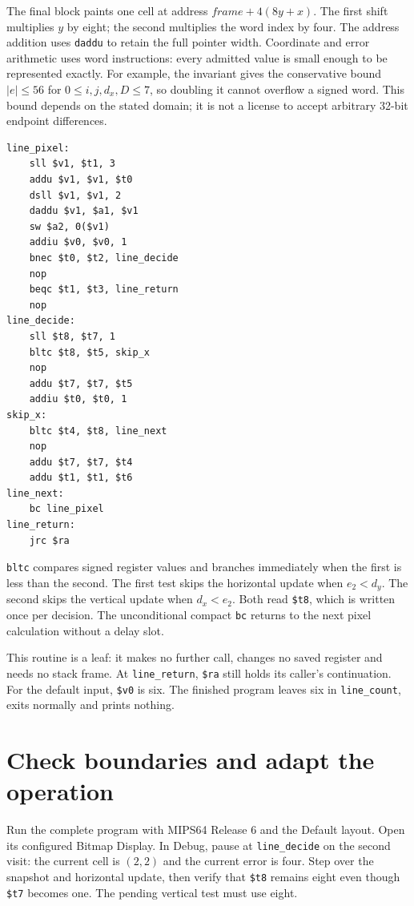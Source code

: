 The final block paints one cell at address $frame+4(8y+x)$. The first shift
multiplies $y$ by eight; the second multiplies the word index by four. The address
addition uses \texttt{daddu} to retain the full pointer width. Coordinate and error
arithmetic uses word instructions: every admitted value is small enough to be
represented exactly. For example, the invariant gives the conservative bound
$|e|\leq56$ for $0\leq i,j,d_x,D\leq7$, so doubling it cannot overflow a signed word.
This bound depends on the stated domain; it is not a license to accept arbitrary
32-bit endpoint differences.

\noindent\begin{minipage}{\linewidth}
  \begin{verbatim}
line_pixel:
    sll $v1, $t1, 3
    addu $v1, $v1, $t0
    dsll $v1, $v1, 2
    daddu $v1, $a1, $v1
    sw $a2, 0($v1)
    addiu $v0, $v0, 1
    bnec $t0, $t2, line_decide
    nop
    beqc $t1, $t3, line_return
    nop
line_decide:
    sll $t8, $t7, 1
    bltc $t8, $t5, skip_x
    nop
    addu $t7, $t7, $t5
    addiu $t0, $t0, 1
skip_x:
    bltc $t4, $t8, line_next
    nop
    addu $t7, $t7, $t4
    addu $t1, $t1, $t6
line_next:
    bc line_pixel
line_return:
    jrc $ra
\end{verbatim}
\end{minipage}

\texttt{bltc} compares signed register values and branches immediately when the
first is less than the second. The first test skips the horizontal update when
$e_2<d_y$. The second skips the vertical update when $d_x<e_2$. Both read
\texttt{\$t8}, which is written once per decision. The unconditional compact
\texttt{bc} returns to the next pixel calculation without a delay slot.

This routine is a leaf: it makes no further call, changes no saved register and
needs no stack frame. At \texttt{line\_return}, \texttt{\$ra} still holds its
caller's continuation. For the default input, \texttt{\$v0} is six. The finished
program leaves six in \texttt{line\_count}, exits normally and prints nothing.

\section{Check boundaries and adapt the operation}

Run the complete program with MIPS64 Release 6 and the Default layout. Open its
configured Bitmap Display. In Debug, pause at \texttt{line\_decide} on the second
visit: the current cell is $(2,2)$ and the current error is four. Step over the
snapshot and horizontal update, then verify that \texttt{\$t8} remains eight even
though \texttt{\$t7} becomes one. The pending vertical test must use eight.

